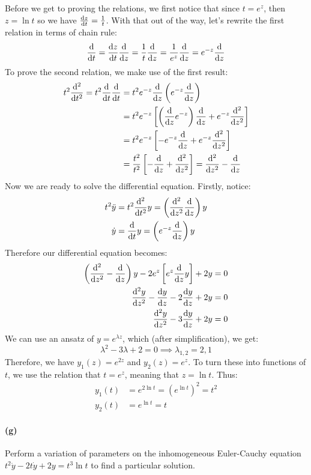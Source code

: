 \documentclass{article}
\begin{document}
\begin{solution}
	Before we get to proving the relations, we first notice that since $t = e^z$, then $z = \ln t$ so we
	have $\dv{z}{t} = \frac{1}{t}$. With that out of the way, let's rewrite the first relation in terms of 
	chain rule:
	\[
		\dv{t} = \dv{z}{t} \dv{z} = \frac{1}{t}\dv{z} = \frac{1}{e^z} \dv{z} = e^{-z} \dv{z}
	\] 
	To prove the second relation, we make use of the first result:
	\begin{align*}
		t^2 \dv[2]{t} = t^2 \dv{t} \dv{t} &= t^2e^{-z} \dv{z}\left( e^{-z}\dv{z} \right) \\
				&=  t^2 e^{-z}\left[ \left( \dv{z} e^{-z} \right) \dv{z} + e^{-z} \dv[2]{z}\right] \\
				&= t^2 e^{-z} \left[-e^{-z} \dv{z} + e^{-z} \dv[2]{z}\right] \\
				&=  \frac{t^2}{t^2}\left[-\dv{z} + \dv[2]{z}\right] = \dv[2]{z} - \dv{z} 
	\end{align*}
	Now we are ready to solve the differential equation. Firstly, notice:
	\begin{align*}
		t^2 \ddot y &= t^2 \dv[2]{t} y = \left( \dv[2]{z} \dv{z} \right) y\\
		\dot y &= \dv{t} y = \left( e^{-z} \dv{z} \right) y
	\end{align*} 
	Therefore our differential equation becomes:
	\begin{align*}
		\left( \dv[2]{z} - \dv{z} \right) y - 2e^z \left[e^z \dv{z} y\right] + 2y &= 0\\
		\dv[2]{y}{z} - \dv{y}{z} - 2 \dv{y}{z} + 2y &=  0 \\
		\dv[2]{y}{z} - 3\dv{y}{z} + 2y &= 0
	\end{align*} 
	We can use an ansatz of $y = e^{\lambda z}$, which (after simplification), we get:
	\[
		\lambda^2 - 3 \lambda + 2 = 0 \implies \lambda_{1, 2} = 2, 1
	\] 
	Therefore, we have $y_1(z) = e^{2z}$ and $y_2(z) = e^z$. To turn these into functions of $t$, we 
	use the relation that $t = e^z$, meaning that $z = \ln t$. Thus:
	\begin{align*}
		y_1(t) &= e^{2 \ln t} = (e^{\ln t})^2 = t^2\\
		y_2(t) &= e^{\ln t} = t 
	\end{align*}
\end{solution}
\paragraph{(g)}		\extrapart
Perform a variation of parameters on the inhomogeneous Euler-Cauchy equation $t^{2}\ddot{y} -2 t\dot{y} + 2y = t^{3}\ln t$ to find a particular solution.
\end{document}
